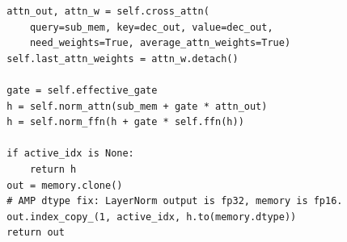 \begin{lstlisting}
        attn_out, attn_w = self.cross_attn(
            query=sub_mem, key=dec_out, value=dec_out,
            need_weights=True, average_attn_weights=True)
        self.last_attn_weights = attn_w.detach()

        gate = self.effective_gate
        h = self.norm_attn(sub_mem + gate * attn_out)
        h = self.norm_ffn(h + gate * self.ffn(h))

        if active_idx is None:
            return h
        out = memory.clone()
        # AMP dtype fix: LayerNorm output is fp32, memory is fp16.
        out.index_copy_(1, active_idx, h.to(memory.dtype))
        return out
\end{lstlisting}
